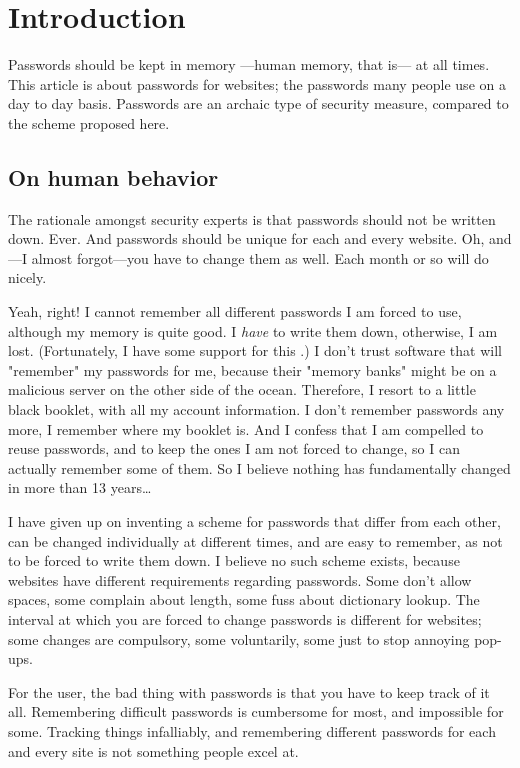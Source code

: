 \section{Introduction}
Passwords should be kept in memory%
---human memory, that is---%
at all times.
This article is about passwords for websites; the passwords many people use on a day to day basis.
Passwords are an archaic type of security measure, compared to the scheme proposed here.
\subsection{On human behavior}
The rationale amongst security experts is that passwords should not be written down.
Ever.
And passwords should be unique for each and every website.
Oh, and---I almost forgot---you have to change them as well.
Each month or so will do nicely. 
\par
Yeah, right!
I cannot remember all different passwords I am forced to use, although my memory is quite good.
I \emph{have} to write them down, otherwise, I am lost.
(Fortunately, I have some support for this \cite{Schneier:2005}.)
I don't trust software that will "remember" my passwords for me, because their "memory banks" might be on a malicious server on the other side of the ocean.
Therefore, I resort to a little black booklet, with all my account information.
I don't remember passwords any more, I remember where my booklet is.
And I confess that I am compelled to reuse passwords, and to keep the ones I am not forced to change, so I can actually remember some of them.
So I believe nothing has fundamentally changed in more than 13 years\ldots\cite{Adams:1999:UE:322796.322806}
\par
I have given up on inventing a scheme for passwords that differ from each other,
can be changed individually at different times, 
and are easy to remember, as not to be forced to write them down.
I believe no such scheme exists, because websites have different requirements regarding passwords.
Some don't allow spaces, some complain about length, some fuss about dictionary lookup.
The interval at which you are forced to change passwords is different for websites;
some changes are compulsory, some voluntarily, some just to stop annoying pop-ups.
\par
For the user, the bad thing with passwords is that you have to keep track of it all.
Remembering difficult passwords is cumbersome for most, and impossible for some.
Tracking things infalliably, and remembering different passwords for each and every site is not something people excel at.
